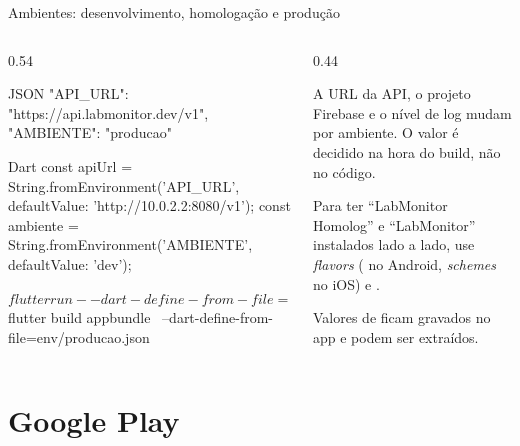 \documentclass[aspectratio=169,10pt]{beamer}
\begin{document}
\begin{frame}[fragile]{Ambientes: desenvolvimento, homologação e produção}
  \begin{columns}[T]
    \begin{column}{0.54\textwidth}
\begin{codigo}[title=env/producao.json]{JSON}
{
  "API_URL": "https://api.labmonitor.dev/v1",
  "AMBIENTE": "producao"
}
\end{codigo}
\begin{codigo}[title=lib/config.dart]{Dart}
const apiUrl = String.fromEnvironment('API_URL',
    defaultValue: 'http://10.0.2.2:8080/v1');
const ambiente = String.fromEnvironment('AMBIENTE',
    defaultValue: 'dev');
\end{codigo}
\begin{terminal}
$ flutter run --dart-define-from-file=env/dev.json
$ flutter build appbundle \
    --dart-define-from-file=env/producao.json
\end{terminal}
    \end{column}
    \begin{column}{0.44\textwidth}
      \begin{conceito}
        A URL da API, o projeto Firebase e o nível de log mudam por ambiente. O valor é decidido na hora do build, não no código.
      \end{conceito}
      \begin{dica}
        Para ter ``LabMonitor Homolog'' e ``LabMonitor'' instalados lado a lado, use \emph{flavors} ( no Android, \emph{schemes} no iOS) e .
      \end{dica}
      \begin{erro}
        Valores de  ficam gravados no app e podem ser extraídos.
      \end{erro}
    \end{column}
  \end{columns}
\end{frame}

\section{Google Play}
\end{document}
